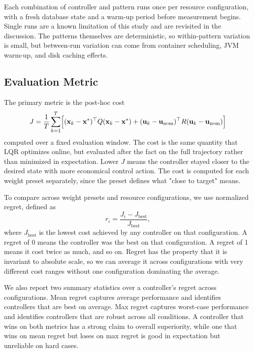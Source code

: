 \documentclass[10pt,a4paper]{article}
\begin{document}
Each combination of controller and pattern runs once per resource configuration, with a fresh database state and a warm-up period before measurement begins. Single runs are a known limitation of this study and are revisited in the discussion. The patterns themselves are deterministic, so within-pattern variation is small, but between-run variation can come from container scheduling, JVM warm-up, and disk caching effects.

\subsection{Evaluation Metric}

The primary metric is the post-hoc cost
\begin{equation}
J = \frac{1}{T} \sum_{k=1}^{T} \Bigl[ (\mathbf{x}_k - \mathbf{x}^*)^\top Q (\mathbf{x}_k - \mathbf{x}^*) + (\mathbf{u}_k - \mathbf{u}_{\text{nom}})^\top R (\mathbf{u}_k - \mathbf{u}_{\text{nom}}) \Bigr]
\end{equation}
computed over a fixed evaluation window. The cost is the same quantity that LQR optimizes online, but evaluated after the fact on the full trajectory rather than minimized in expectation. Lower $J$ means the controller stayed closer to the desired state with more economical control action. The cost is computed for each weight preset separately, since the preset defines what "close to target" means.

To compare across weight presets and resource configurations, we use normalized regret, defined as
\begin{equation}
r_i = \frac{J_i - J_{\text{best}}}{J_{\text{best}}},
\end{equation}
where $J_{\text{best}}$ is the lowest cost achieved by any controller on that configuration. A regret of 0 means the controller was the best on that configuration. A regret of 1 means it cost twice as much, and so on. Regret has the property that it is invariant to absolute scale, so we can average it across configurations with very different cost ranges without one configuration dominating the average.

We also report two summary statistics over a controller's regret across configurations. Mean regret captures average performance and identifies controllers that are best on average. Max regret captures worst-case performance and identifies controllers that are robust across all conditions. A controller that wins on both metrics has a strong claim to overall superiority, while one that wins on mean regret but loses on max regret is good in expectation but unreliable on hard cases.
\end{document}
